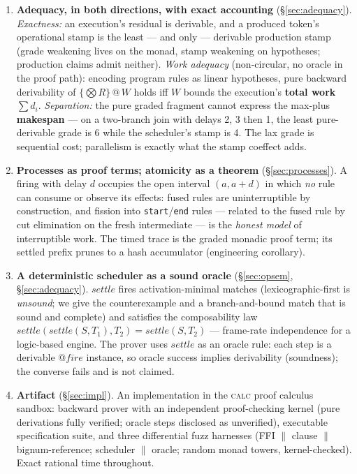 \documentclass[11pt]{article}
\makeatletter
\newcommand{\lax}[2]{\{#1\}\mathbin{@}#2}       %
\newcommand{\settle}{\mathit{settle}}
\newcommand{\calc}{\textsc{calc}}               %
\theoremstyle{definition}
\theoremstyle{remark}
\makeatother
\begin{document}
\begin{enumerate}
\item \textbf{Adequacy, in both directions, with exact accounting}
  (\S\ref{sec:adequacy}).  \emph{Exactness:} an execution's residual is
  derivable, and a produced token's operational stamp is the least --- and only
  --- derivable production stamp (grade weakening lives on the monad, stamp
  weakening on hypotheses; production claims admit neither).  \emph{Work
  adequacy} (non-circular, no oracle in the proof path): encoding program rules
  as linear hypotheses, pure backward derivability of $\lax{\bigotimes R}{W}$
  holds iff $W$ bounds the execution's \textbf{total work} $\sum d_i$.
  \emph{Separation:} the pure graded fragment cannot express the max-plus
  \textbf{makespan} --- on a two-branch join with delays 2, 3 then 1, the least
  pure-derivable grade is 6 while the scheduler's stamp is 4.  The lax grade is
  sequential cost; parallelism is exactly what the stamp coeffect adds.

\item \textbf{Processes as proof terms; atomicity as a theorem}
  (\S\ref{sec:processes}).  A firing with delay $d$ occupies the open interval
  $(a, a{+}d)$ in which \emph{no} rule can consume or observe its effects: fused
  rules are uninterruptible by construction, and fission into \texttt{start}/\texttt{end}
  rules --- related to the fused rule by cut elimination on the fresh
  intermediate --- is the \emph{honest model} of interruptible work.  The timed
  trace is the graded monadic proof term; its settled prefix prunes to a hash
  accumulator (engineering corollary).

\item \textbf{A deterministic scheduler as a sound oracle} (\S\ref{sec:opsem},
  \S\ref{sec:adequacy}).  $\settle$ fires activation-minimal matches
  (lexicographic-first is \emph{unsound}; we give the counterexample and a
  branch-and-bound match that is sound and complete) and satisfies the
  composability law $\settle(\settle(S,T_1),T_2) = \settle(S,T_2)$ ---
  frame-rate independence for a logic-based engine.  The prover uses
  $\settle$ as an oracle rule: each step is a derivable $\mathit{@fire}$
  instance, so oracle success implies derivability (soundness); the converse
  fails and is not claimed.

\item \textbf{Artifact} (\S\ref{sec:impl}).  An implementation in the \calc{}
  proof calculus sandbox: backward prover with an independent proof-checking
  kernel (pure derivations fully verified; oracle steps disclosed as
  unverified), executable specification suite, and three differential fuzz
  harnesses (FFI $\|$ clause $\|$ bignum-reference; scheduler $\|$ oracle;
  random monad towers, kernel-checked).  Exact rational time throughout.
\end{enumerate}
\end{document}
